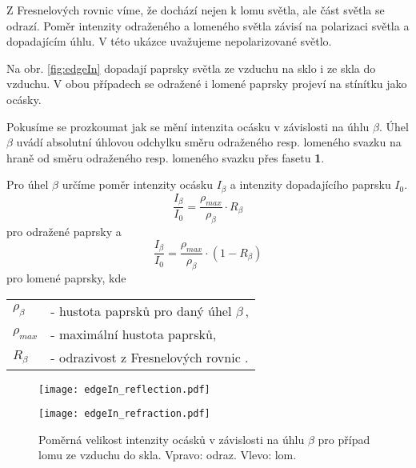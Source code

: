 Z Fresnelových rovnic \cite{Handbook} víme, že dochází nejen k lomu světla, ale část světla se odrazí. Poměr intenzity odraženého a lomeného světla závisí na polarizaci světla a dopadajícím úhlu. V této ukázce uvažujeme nepolarizované světlo. 

Na obr. \ref{fig:edgeIn} dopadají paprsky světla ze vzduchu na sklo i ze skla do vzduchu. V obou případech se odražené i lomené paprsky projeví  na stínítku jako ocásky.

Pokusíme se prozkoumat jak se mění intenzita ocásku v závislosti na úhlu $\beta$. Úhel $\beta$ uvádí absolutní úhlovou odchylku směru odraženého resp. lomeného svazku na hraně od směru odraženého resp. lomeného svazku přes fasetu \textbf{1}.  

Pro úhel $\beta$ určíme poměr intenzity ocásku $I_{\beta}$ a intenzity dopadajícího paprsku $I_0$. 
\begin{equation}
 \frac{I_\beta}{I_0}  = \frac{\rho_{{max}}}{\rho_\beta}\cdot R_\beta
\end{equation}
pro odražené paprsky a 
\begin{equation}
 \frac{I_\beta}{I_0}  = \frac{\rho_{max}}{\rho_\beta}\cdot (1-R_\beta)
\end{equation}
pro lomené paprsky, kde  

	\begin{tabular}{l l}
	$\rho_{\beta}$  & 	- hustota paprsků pro daný úhel $\beta\,$,\\
	$\rho_{{max}}$ 	&	- maximální hustota paprsků,\\
	$R_\beta$		&	- odrazivost z Fresnelových rovnic \cite{Handbook}.	 \\
	
	\end{tabular}
	\vspace{1mm}

\begin{figure}[h!]
\centering
\begin{minipage}[c]{0.48\textwidth}
\texttt{[image: edgeIn\_reflection.pdf]}
\end{minipage}
\begin{minipage}[c]{0.48\textwidth}
\texttt{[image: edgeIn\_refraction.pdf]}
\end{minipage}
\caption[Poměrná velikost intenzity ocásku případ lomu ze vzduchu do skla.]{Poměrná velikost intenzity ocásků v závislosti na úhlu $\beta$ pro případ lomu ze vzduchu do skla. Vpravo: odraz. Vlevo: lom.}
\label{fig:edgeInGraf}
\end{figure}

